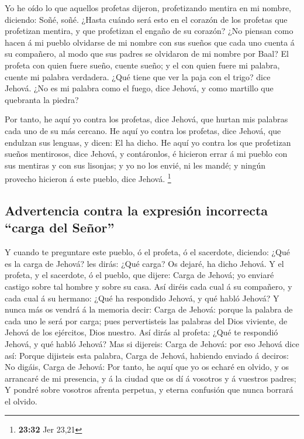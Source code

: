  Yo he oído lo que aquellos profetas dijeron, profetizando
mentira en mi nombre, diciendo: Soñé, soñé.  ¿Hasta cuándo
será esto en el corazón de los profetas que profetizan mentira, y que
profetizan el engaño de su corazón?  ¿No piensan como hacen
á mi pueblo olvidarse de mi nombre con sus sueños que cada uno cuenta á
su compañero, al modo que sus padres se olvidaron de mi nombre por Baal?
 El profeta con quien fuere sueño, cuente sueño; y el con
quien fuere mi palabra, cuente mi palabra verdadera. ¿Qué tiene que ver
la paja con el trigo? dice Jehová.  ¿No es mi palabra como
el fuego, dice Jehová, y como martillo que quebranta la piedra?

 Por tanto, he aquí yo contra los profetas, dice Jehová,
que hurtan mis palabras cada uno de su más cercano.  He
aquí yo contra los profetas, dice Jehová, que endulzan sus lenguas, y
dicen: El ha dicho.  He aquí yo contra los que profetizan
sueños mentirosos, dice Jehová, y contáronlos, é hicieron errar á mi
pueblo con sus mentiras y con sus lisonjas; y yo no los envié, ni les
mandé; y ningún provecho hicieron á este pueblo, dice Jehová.
\footnote{\textbf{23:32} Jer 23,21}

\hypertarget{advertencia-contra-la-expresiuxf3n-incorrecta-carga-del-seuxf1or}{%
\subsection{Advertencia contra la expresión incorrecta ``carga del
Señor''}\label{advertencia-contra-la-expresiuxf3n-incorrecta-carga-del-seuxf1or}}

 Y cuando te preguntare este pueblo, ó el profeta, ó el
sacerdote, diciendo: ¿Qué es la carga de Jehová? les dirás: ¿Qué carga?
Os dejaré, ha dicho Jehová.  Y el profeta, y el sacerdote,
ó el pueblo, que dijere: Carga de Jehová; yo enviaré castigo sobre tal
hombre y sobre su casa.  Así diréis cada cual á su
compañero, y cada cual á su hermano: ¿Qué ha respondido Jehová, y qué
habló Jehová?  Y nunca más os vendrá á la memoria decir:
Carga de Jehová: porque la palabra de cada uno le será por carga; pues
pervertisteis las palabras del Dios viviente, de Jehová de los
ejércitos, Dios nuestro.  Así dirás al profeta: ¿Qué te
respondió Jehová, y qué habló Jehová?  Mas si dijereis:
Carga de Jehová: por eso Jehová dice así: Porque dijisteis esta palabra,
Carga de Jehová, habiendo enviado á deciros: No digáis, Carga de Jehová:
 Por tanto, he aquí que yo os echaré en olvido, y os
arrancaré de mi presencia, y á la ciudad que os dí á vosotros y á
vuestros padres;  Y pondré sobre vosotros afrenta perpetua,
y eterna confusión que nunca borrará el olvido.

